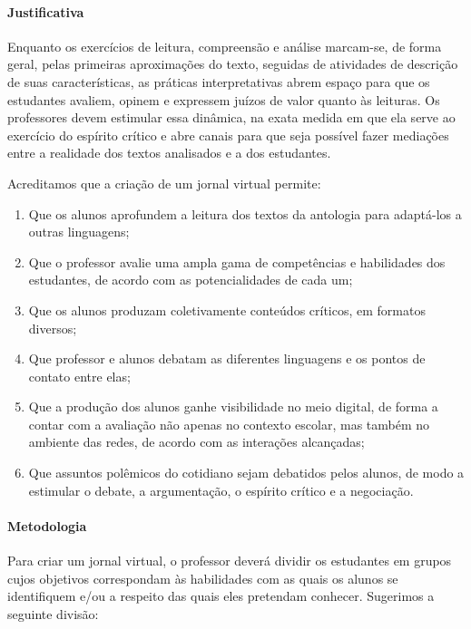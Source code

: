 \documentclass[11pt]{extarticle}
\begin{document}
\paragraph{Justificativa} Enquanto os exercícios de leitura, compreensão e
análise marcam-se, de forma geral, pelas primeiras aproximações do
texto, seguidas de atividades de descrição de suas características, as
práticas interpretativas abrem espaço para que os estudantes avaliem,
opinem e expressem juízos de valor quanto às leituras. Os professores
devem estimular essa dinâmica, na exata medida em que ela serve ao
exercício do espírito crítico e abre canais para que seja possível fazer
mediações entre a realidade dos textos analisados e a dos
estudantes.

Acreditamos que a criação de um jornal virtual permite:
\begin{enumerate}
\item
Que os alunos
aprofundem a leitura dos textos da antologia para adaptá-los a outras
linguagens; 
\item
Que o professor avalie uma ampla gama de competências e
habilidades dos estudantes, de acordo com as potencialidades de cada um;
\item
Que os alunos produzam coletivamente conteúdos críticos, em formatos
diversos; 
\item
Que professor e alunos debatam as diferentes linguagens e
os pontos de contato entre elas; 
\item
Que a produção dos alunos ganhe
visibilidade no meio digital, de forma a contar com a avaliação não
apenas no contexto escolar, mas também no ambiente das redes, de acordo
com as interações alcançadas; 
\item
Que assuntos polêmicos do cotidiano
sejam debatidos pelos alunos, de modo a estimular o debate, a
argumentação, o espírito crítico e a negociação.
\end{enumerate}

\paragraph{Metodologia}
Para criar um jornal virtual, o professor deverá dividir os estudantes
em grupos cujos objetivos correspondam às habilidades com as quais os
alunos se identifiquem e/ou a respeito das quais eles pretendam
conhecer. Sugerimos a seguinte divisão:
\end{document}

